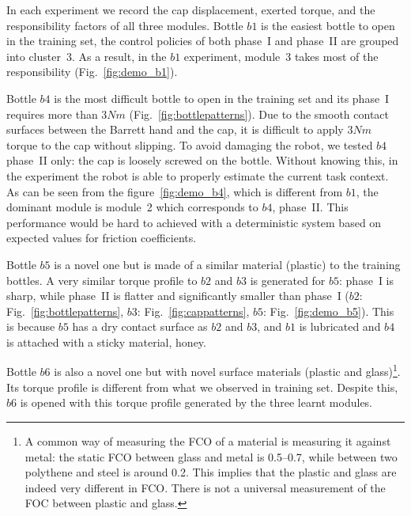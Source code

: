 In each experiment we record the cap displacement, exerted torque, and
the responsibility factors of all three modules. Bottle $b1$ is the
easiest bottle to open in the training set, the control policies of
both phase~I and phase~II are grouped into cluster~3. As a result,
in the $b1$ experiment, module~3 takes most of the responsibility
(Fig.~\ref{fig:demo_b1}). 

Bottle $b4$ is the most difficult bottle to open in the training set
and its phase~I requires more than $3Nm$
(Fig.~\ref{fig:bottlepatterns}). Due to the smooth contact surfaces
between the Barrett hand and the cap, it is difficult to apply $3Nm$
torque to the cap without slipping. To avoid damaging the robot, we
tested $b4$ phase~II only: the cap is loosely screwed on the
bottle. Without knowing this, in the experiment the robot is able to
properly estimate the current task context. As can be seen from the
figure~\ref{fig:demo_b4}, which is different from $b1$, the dominant
module is module~2 which corresponds to  $b4$, phase~II. This
performance would be hard to achieved with a deterministic system based
on expected values for friction coefficients.

Bottle $b5$ is a novel one but is made of a similar material (plastic) to
the training bottles. A very similar torque profile to $b2$ and $b3$ is
generated for $b5$: phase~I is sharp, while phase~II is flatter and
significantly smaller than phase~I ($b2$:
Fig.~\ref{fig:bottlepatterns}, $b3$: Fig.~\ref{fig:cappatterns},
$b5$: Fig.~\ref{fig:demo_b5}). This is because $b5$ has a dry contact
surface as $b2$ and $b3$, and $b1$ is lubricated and $b4$ is attached with
a sticky material, honey.

Bottle $b6$ is also a novel one but with novel surface materials
(plastic and glass)\footnote{A common way of measuring the FCO of a
  material is measuring it against metal: the static FCO between glass
  and metal is 0.5--0.7, while between two polythene and steel is
  around 0.2. This implies that the plastic and glass are indeed very
  different in FCO. There is not a universal measurement of the FOC
  between plastic and glass.}. Its torque profile is different from
what we observed in training set. Despite this, $b6$ is opened with this
torque profile generated by the three learnt modules.


